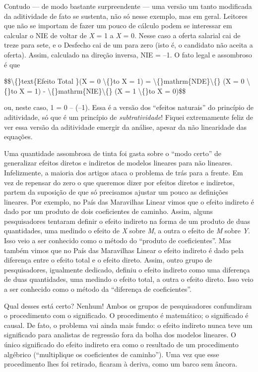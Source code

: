 \documentclass[11pt,a5paper,twoside]{book}
\begin{document}
Contudo — de modo bastante surpreendente — uma versão um tanto modificada da aditividade de fato se sustenta, não só nesse exemplo, mas em geral. Leitores que não se importam de fazer um pouco de cálculo podem se interessar em calcular o NIE de voltar de \textit{X} = 1 a \textit{X} = 0. Nesse caso a oferta salarial cai de treze para sete, e o Desfecho cai de um para zero (isto é, o candidato não aceita a oferta). Assim, calculado na direção inversa, NIE = –1. O fato legal e assombroso é que

\$\$\textbackslash\{\}text\{Efeito Total \}(X = 0 \textbackslash\{\}to X = 1) = \textbackslash\{\}mathrm\{NDE\}\textbackslash\{\} (X = 0 \textbackslash\{\}to X = 1) - \textbackslash\{\}mathrm\{NIE\}\textbackslash\{\} (X = 1 \textbackslash\{\}to X = 0)\$\$

ou, neste caso, 1 = 0 – (–1). Essa é a versão dos “efeitos naturais” do princípio de aditividade, só que é um princípio de \textit{subtratividade}! Fiquei extremamente feliz de ver essa versão da aditividade emergir da análise, apesar da não linearidade das equações.

Uma quantidade assombrosa de tinta foi gasta sobre o “modo certo” de generalizar efeitos diretos e indiretos de modelos lineares para não lineares. Infelizmente, a maioria dos artigos ataca o problema de trás para a frente. Em vez de repensar do zero o que queremos dizer por efeitos diretos e indiretos, partem da suposição de que só precisamos ajustar um pouco as definições lineares. Por exemplo, no País das Maravilhas Linear vimos que o efeito indireto é dado por um produto de dois coeficientes de caminho. Assim, alguns pesquisadores tentaram definir o efeito indireto na forma de um produto de duas quantidades, uma medindo o efeito de \textit{X} sobre \textit{M}, a outra o efeito de \textit{M} sobre \textit{Y}. Isso veio a ser conhecido como o método do “produto de coeficientes”. Mas também vimos que no País das Maravilhas Linear o efeito indireto é dado pela diferença entre o efeito total e o efeito direto. Assim, outro grupo de pesquisadores, igualmente dedicado, definiu o efeito indireto como uma diferença de duas quantidades, uma medindo o efeito total, a outra o efeito direto. Isso veio a ser conhecido como o método da “diferença de coeficientes”.

Qual desses está certo? Nenhum! Ambos os grupos de pesquisadores confundiram o procedimento com o significado. O procedimento é matemático; o significado é causal. De fato, o problema vai ainda mais fundo: o efeito indireto nunca teve um significado para analistas de regressão fora da bolha dos modelos lineares. O único significado do efeito indireto era como o resultado de um procedimento algébrico (“multiplique os coeficientes de caminho”). Uma vez que esse procedimento lhes foi retirado, ficaram à deriva, como um barco sem âncora.
\end{document}
